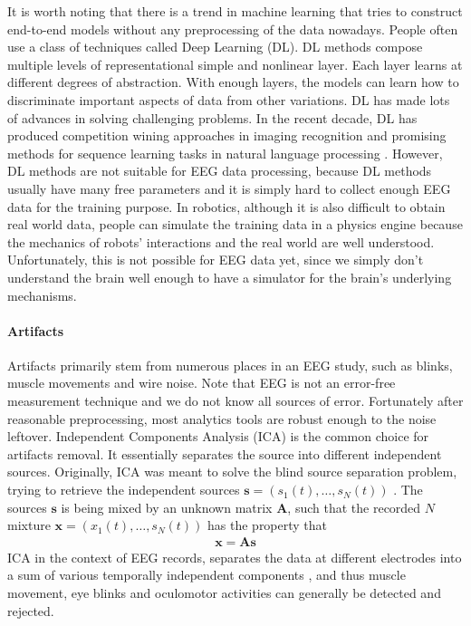 \documentclass[a4paper,11pt,oneside]{article}
\begin{document}
It is worth noting that there is a trend in machine learning that tries to construct end-to-end models without any preprocessing of the data nowadays. People often use a class of techniques called Deep Learning (DL).  DL methods compose multiple levels of representational simple and nonlinear layer. Each layer learns at different degrees of abstraction. With enough layers, the models can learn how to discriminate important aspects of data from other variations. DL has made lots of advances in solving challenging problems. In the recent decade, DL has produced competition wining approaches in imaging recognition \cite{krizhevsky2012imagenet}\cite{farabet2013learning} and promising methods for sequence learning tasks in natural language processing \cite{bordes2014question} \cite{luong2014addressing}. However, DL methods are not suitable for EEG data processing, because DL methods usually have many free parameters and it is simply hard to collect enough EEG data for the training purpose. In robotics, although it is also difficult to obtain real world data, people can simulate the training data in a physics engine because the mechanics of robots' interactions and the real world are well understood. Unfortunately, this is not possible for EEG data yet, since we simply don't understand the brain well enough to have a simulator for the brain's underlying mechanisms.


\paragraph{Artifacts}
Artifacts  primarily stem from numerous places in an EEG study, such as blinks, muscle movements and wire noise. Note that EEG is not an error-free measurement technique and we do not know all sources of error. Fortunately after reasonable preprocessing, most analytics tools are robust enough to the noise leftover. Independent Components Analysis (ICA) is the common choice for artifacts removal. It essentially separates the source into different independent sources. Originally, ICA was meant to solve the blind source separation problem, trying to retrieve the independent sources $ \mathbf{s} = ({s_1(t), \dots, s_N(t)})$ \cite{comon1994independent}. The sources $\mathbf{s}$ is being mixed by an unknown matrix $\mathbf{A}$, such that the recorded $N$ mixture $ \mathbf{x} = ({x_1(t), \dots, s_N(t)})$ has the property that 
\begin{align}
\mathbf{x = As}
\end{align} 
ICA in the context of EEG records, separates the data at different electrodes into a sum of various temporally independent components \cite{jung2000removing}, and thus muscle movement, eye blinks and oculomotor activities can generally be detected and rejected. 
\end{document}
